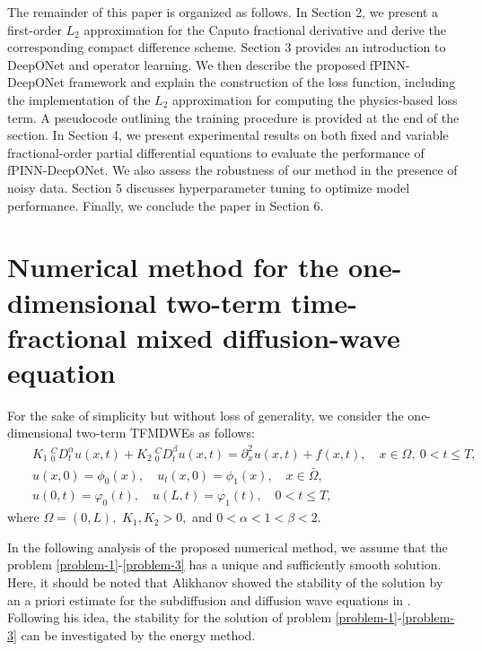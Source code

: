 \documentclass[11pt]{article}
\begin{document}
The remainder of this paper is organized as follows. In Section 2, we present a first-order $L_2$ approximation for the Caputo fractional derivative and derive the corresponding compact difference scheme. Section 3 provides an introduction to DeepONet and operator learning. We then describe the proposed fPINN-DeepONet framework and explain the construction of the loss function, including the implementation of the $L_2$ approximation for computing the physics-based loss term. A pseudocode outlining the training procedure is provided at the end of the section. In Section 4, we present experimental results on both fixed and variable fractional-order partial differential equations to evaluate the performance of fPINN-DeepONet. We also assess the robustness of our method in the presence of noisy data. Section 5 discusses hyperparameter tuning to optimize model performance. Finally, we conclude the paper in Section 6.


% 


\section{Numerical method for the one-dimensional two-term time-fractional  mixed diffusion-wave equation}
\label{2.numerical method}
\setcounter{equation}{0}


For the sake of simplicity but without loss of  generality,  we  consider the one-dimensional two-term TFMDWEs as follows:
\begin{eqnarray}
&&K_1\  _0^{C}D_t^{\alpha}u(x,t)+K_2\  _0^{C}D_t^{\beta}u(x,t)= \partial_x^{2}u(x,t) +f(x,t),\quad x\in \Omega,~0<t\leq T, \label{problem-1}\\
&&u(x,0)=\phi_0(x),\quad u_t(x,0)=\phi_1(x),\quad x\in \bar{\Omega},\label{problem-2} \\
 &&u(0,t)=\varphi_0(t),\quad u(L,t)=\varphi_1(t),\quad 0< t\leq T ,\label{problem-3}
\end{eqnarray}
where $\Omega=(0,L),$ $K_1,K_2> 0,$   and  $0< \alpha< 1 <\beta< 2.$

In the following analysis of the proposed numerical method, we assume that the problem \eqref{problem-1}-\eqref{problem-3} has a unique and sufficiently smooth solution.
Here, it should be noted that Alikhanov showed the stability of the solution by an a priori estimate for the subdiffusion and diffusion wave equations in \cite{Alikhanov2010}.  Following his idea, the stability for the solution of problem \eqref{problem-1}-\eqref{problem-3} can be investigated by the energy method.
\end{document}
